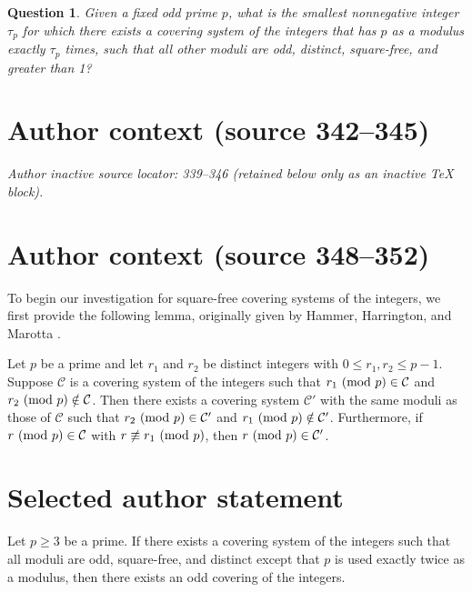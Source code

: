 \documentclass[10pt,a4paper]{amsart}
\renewcommand{\mod}[2]{#1\textup{ (mod }#2\textup{)}}
\newtheorem{question}{Question}
\begin{document}

\begin{question}\label{question:mainquestionsquarefree}
Given a fixed odd prime $p$, what is the smallest nonnegative integer $\tau_p$ for which there exists a covering system of the integers that has $p$ as a modulus exactly $\tau_p$ times, such that all other moduli are odd, distinct, square-free, and greater than 1?
\end{question}

\section*{Author context (source 342--345)}
\noindent\textit{Author inactive source locator: 339--346 (retained below only as an inactive TeX block).}

\section*{Author context (source 348--352)}
To begin our investigation for square-free covering systems of the integers, we first provide the following lemma, originally given by Hammer, Harrington, and Marotta \cite{hhm}.

\begin{lemma}\label{lem:shifted}
Let $p$ be a prime and let $r_1$ and $r_2$ be distinct integers with $0\leq r_1,r_2\leq p-1$. Suppose $\mathcal{C}$ is a covering system of the integers such that $\mod{r_1}{p}\in\mathcal{C}$ and $\mod{r_2}{p}\notin\mathcal{C}$. Then there exists a covering system $\mathcal{C}'$ with the same moduli as those of $\mathcal{C}$ such that $\mod{r_2}{p}\in\mathcal{C}'$ and $\mod{r_1}{p}\notin\mathcal{C}'$. Furthermore, if $\mod{r}{p}\in\mathcal{C}$ with $r\not\equiv\mod{r_1}{p}$, then $\mod{r}{p}\in\mathcal{C}'$.
\end{lemma}
\section*{Selected author statement}
\begin{theorem}\label{thm:3sqrfreeimpliesodd}
Let $p\geq3$ be a prime. If there exists a covering system of the integers such that all moduli are odd, square-free, and distinct except that $p$ is used exactly twice as a modulus, then there exists an odd covering of the integers.
\end{theorem}
\end{document}
